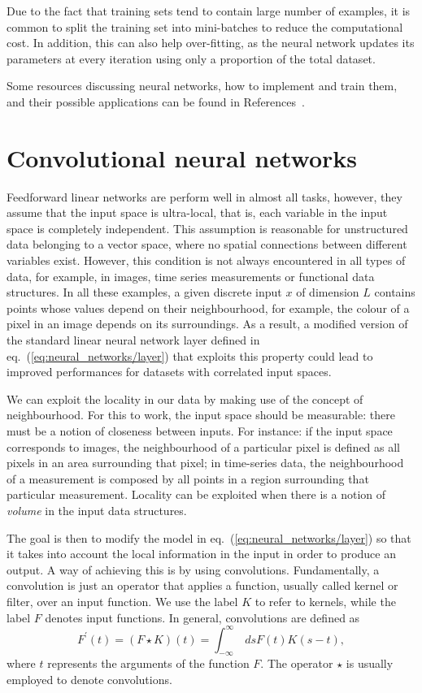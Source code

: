 Due to the fact that training sets tend to contain large number of examples, it is common to split
the training set into mini-batches to reduce the computational cost. In addition, this can also help
over-fitting, as the neural network updates its parameters at every iteration using only a
proportion of the total dataset.

Some resources discussing neural networks, how to implement and train them, and their possible
applications can be found in References~\cite{goodfellow2017deep, ketkar2017deep,
nielsen2015neural}.
 
\section{Convolutional neural networks} 
Feedforward linear networks are perform well in almost all tasks, however, they assume that the
input space is ultra-local, that is, each variable in the input space is completely independent.
This assumption is reasonable for unstructured data belonging to a vector space, where no spatial
connections between different variables exist. However, this condition is not always encountered in
all types of data, for example, in images, time series measurements or functional data structures.
In all these examples, a given discrete input $x$ of dimension $L$ contains points whose values
depend on their neighbourhood, for example, the colour of a pixel in an image depends on its
surroundings. As a result, a modified version of the standard linear neural network layer defined in
eq.~(\ref{eq:neural_networks/layer}) that exploits this property could lead to improved performances
for datasets with correlated input spaces.
 
We can exploit the locality in our data by making use of the concept of neighbourhood. For this to
work, the input space should be measurable: there must be a notion of closeness between inputs. For
instance: if the input space corresponds to images, the neighbourhood of a particular pixel is
defined as all pixels in an area surrounding that pixel; in time-series data, the neighbourhood of a
measurement is composed by all points in a region surrounding that particular measurement. Locality
can be exploited when there is a notion of \textit{volume} in the input data structures.

The goal is then to modify the model in eq.~(\ref{eq:neural_networks/layer}) so that it takes into
account the local information in the input in order to produce an output. A way of achieving this is
by using convolutions. Fundamentally, a convolution is just an operator that applies a function,
usually called kernel or filter, over an input function. We use the label $K$ to refer to kernels,
while the label $F$ denotes input functions. In general, convolutions are defined as
\begin{equation}
    F^\prime(t) = (F \star K)(t)  = \int_{-\infty}^\infty\ ds F(t) K(s - t),
\end{equation}
where $t$ represents the arguments of the function $F$. The operator $\star$ is usually employed to
denote convolutions.

